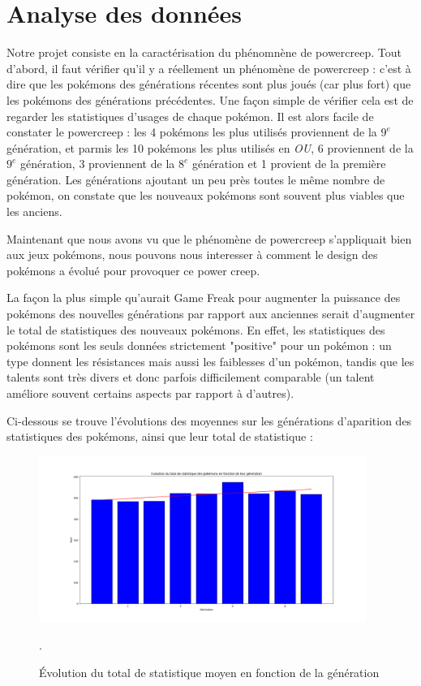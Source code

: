 \documentclass[a4paper,12pt]{article}
\begin{document}
\section{Analyse des données}

Notre projet consiste en la caractérisation du phénomnène de powercreep. Tout
d'abord, il faut vérifier qu'il y a réellement un phénomène de powercreep :
c'est à dire que les pokémons des générations récentes sont plus joués (car plus
fort) que les pokémons des générations précédentes. Une façon simple de vérifier
cela est de regarder les statistiques d'usages de chaque pokémon. Il est alors
facile de constater le powercreep : les 4 pokémons les plus utilisés proviennent
de la $9^{e}$ génération, et parmis les 10 pokémons les plus utilisés en
\textit{OU}, 6 proviennent de la $9^{e}$ génération, 3 proviennent de la $8^{e}$
génération et 1 provient de la première génération. Les générations ajoutant un
peu près toutes le même nombre de pokémon, on constate que les nouveaux pokémons
sont souvent plus viables que les anciens.

Maintenant que nous avons vu que le phénomène de powercreep s'appliquait bien
aux jeux pokémons, nous pouvons nous interesser à comment le design des pokémons
a évolué pour provoquer ce power creep.

La façon la plus simple qu'aurait Game Freak pour augmenter la puissance des
pokémons des nouvelles générations par rapport aux anciennes serait d'augmenter
le total de statistiques des nouveaux pokémons. En effet, les statistiques des
pokémons sont les seuls données strictement "positive" pour un pokémon :  un
type donnent les résistances mais aussi les faiblesses d'un pokémon, tandis que
les talents sont très divers et donc parfois difficilement comparable (un talent
améliore souvent certains aspects par rapport à d'autres).

Ci-dessous se trouve l'évolutions des moyennes sur les générations d'aparition
des statistiques des pokémons, ainsi que leur total de statistique :

\begin{figure}[!h]
    \centering
    \includegraphics[width=0.95\textwidth]{Image/Total_avg.png}
    \caption{Évolution du total de statistique moyen en fonction de la
    génération}.
    \label{fig:image3}
\end{figure}
\end{document}
